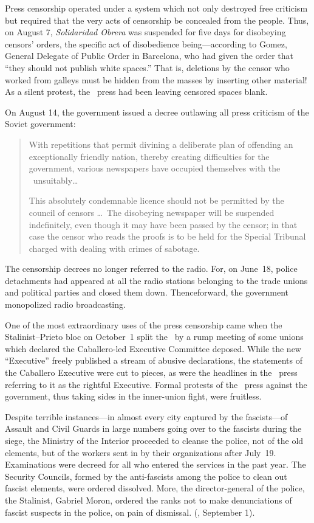 Press censorship operated under a system which not only destroyed free criticism but required that the very acts of censorship be concealed from the people. Thus, on August 7, \emph{Solidaridad Obrera} was suspended for five days for disobeying censors’ orders, the specific act of disobedience being---according to Gomez, General Delegate of Public Order in Barcelona, who had given the order that ``they should not publish white spaces.'' That is, deletions by the censor who worked from galleys must be hidden from the masses by inserting other material! As a silent protest, the \CNT\ press had been leaving censored spaces blank.

On August 14, the government issued a decree outlawing all press criticism of the Soviet government:

\begin{quotation}
  With repetitions that permit divining a deliberate plan of offending an exceptionally friendly nation, thereby creating difficulties for the government, various newspapers have occupied themselves with the \USSR\ unsuitably\dots
  
  This absolutely condemnable licence should not be permitted by the council of censors \dots\ The disobeying newspaper will be suspended indefinitely, even though it may have been passed by the censor; in that case the censor who reads the proofs is to be held for the Special Tribunal charged with dealing with crimes of sabotage.
\end{quotation}

The censorship decrees no longer referred to the radio. For, on June~18, police detachments had appeared at all the radio stations belonging to the trade unions and political parties and closed them down. Thenceforward, the government monopolized radio broadcasting.

One of the most extraordinary uses of the press censorship came when the Stalinist--Prieto bloc on October~1 split the \UGT\ by a rump meeting of some unions which declared the Caballero-led Executive Committee deposed. While the new ``Executive'' freely published a stream of abusive declarations, the statements of the Caballero Executive were cut to pieces, as were the headlines in the \CNT\ press referring to it as the rightful Executive. Formal protests of the \CNT\ press against the government, thus taking sides in the inner-union fight, were fruitless.

Despite terrible instances---in almost every city captured by the fascists---of Assault and Civil Guards in large numbers going over to the fascists during the siege, the Ministry of the Interior proceeded to cleanse the police, not of the old elements, but of the workers sent in by their organizations after July~19. Examinations were decreed for all who entered the services in the past year. The Security Councils, formed by the anti-fascists among the police to clean out fascist elements, were ordered dissolved. More, the director-general of the police, the Stalinist, Gabriel Moron, ordered the ranks not to make denunciations of fascist suspects in the police, on pain of dismissal. (\emph{\CNT}, September 1).

